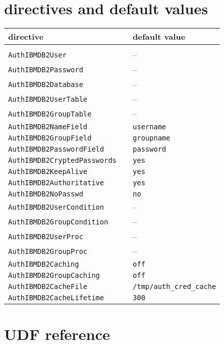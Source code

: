 \documentclass[11pt,a4paper]{article}
\begin{document}
\begin{appendix}
\section{directives and default values} \label{default}
\vspace{5ex}
\begin{tabular}{@{} lll @{}}
directive & & default value \\
\hline
& & \\
{\tt AuthIBMDB2User} & & -- \\[0.5ex]
{\tt AuthIBMDB2Password} & & -- \\[0.5ex]
{\tt AuthIBMDB2Database} & & -- \\[0.5ex]
{\tt AuthIBMDB2UserTable} & & -- \\[0.5ex]
{\tt AuthIBMDB2GroupTable} & & -- \\[0.5ex]
{\tt AuthIBMDB2NameField} & & {\tt username} \\[0.5ex]
{\tt AuthIBMDB2GroupField} & & {\tt groupname} \\[0.5ex]
{\tt AuthIBMDB2PasswordField} & & {\tt password} \\[0.5ex]
{\tt AuthIBMDB2CryptedPasswords} & & {\tt yes} \\[0.5ex]
{\tt AuthIBMDB2KeepAlive} & & {\tt yes} \\[0.5ex]
{\tt AuthIBMDB2Authoritative} & & {\tt yes} \\[0.5ex] 
{\tt AuthIBMDB2NoPasswd} & & {\tt no} \\[0.5ex]
{\tt AuthIBMDB2UserCondition} & & -- \\[0.5ex]
{\tt AuthIBMDB2GroupCondition} & & -- \\[0.5ex]
{\tt AuthIBMDB2UserProc} & & -- \\[0.5ex]
{\tt AuthIBMDB2GroupProc} & & -- \\[0.5ex]
{\tt AuthIBMDB2Caching} & & {\tt off} \\[0.5ex]
{\tt AuthIBMDB2GroupCaching} & & {\tt off} \\[0.5ex]
{\tt AuthIBMDB2CacheFile} & & {\tt /tmp/auth\_cred\_cache} \\[0.5ex]
{\tt AuthIBMDB2CacheLifetime} & & {\tt 300} \\[0.5ex]
\end{tabular}
\newpage
\section{UDF reference} \label{udfreference}
\hypertarget{hmd5}{}

\end{appendix}
\end{document}
